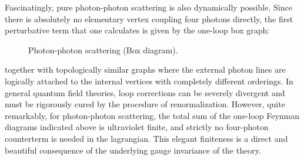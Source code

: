 Fascinatingly, pure photon-photon scattering is also dynamically possible. Since there is absolutely no elementary vertex coupling four photons directly, the first perturbative term that one calculates is given by the one-loop box graph:
\begin{figure}[H]
    \centering
    \caption{Photon-photon scattering (Box diagram).}
\end{figure}
together with topologically similar graphs where the external photon lines are logically attached to the internal vertices with completely different orderings. In general quantum field theories, loop corrections can be severely divergent and must be rigorously cured by the procedure of renormalization. However, quite remarkably, for photon-photon scattering, the total sum of the one-loop Feynman diagrams indicated above is ultraviolet finite, and strictly no four-photon counterterm is needed in the lagrangian. This elegant finiteness is a direct and beautiful consequence of the underlying gauge invariance of the theory.
